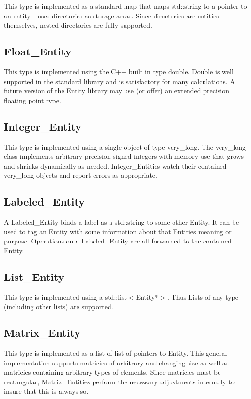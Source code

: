 \documentclass{report}
\begin{document}
This type is implemented as a standard map that maps std::string to a pointer to an entity.
\CLAC\ uses directories as storage areas. Since directories are entities themselves, nested
directories are fully supported.

\subsection{Float\_Entity}

This type is implemented using the C++ built in type double. Double is well supported in the
standard library and is satisfactory for many calculations. A future version of the Entity
library may use (or offer) an extended precision floating point type.

\subsection{Integer\_Entity}

This type is implemented using a single object of type very\_long. The very\_long class
implements arbitrary precision signed integers with memory use that grows and shrinks
dynamically as needed. Integer\_Entities watch their contained very\_long objects and report
errors as appropriate.

\subsection{Labeled\_Entity}

A Labeled\_Entity binds a label as a std::string to some other Entity. It can be used to tag an
Entity with some information about that Entities meaning or purpose. Operations on a
Labeled\_Entity are all forwarded to the contained Entity.

\subsection{List\_Entity}

This type is implemented using a std::list$<$Entity*$>$. Thus Lists of any type (including other
lists) are supported.

\subsection{Matrix\_Entity}

This type is implemented as a list of list of pointers to Entity. This general implementation
supports matricies of arbitrary and changing size as well as matricies containing arbitrary
types of elements. Since matricies must be rectangular, Matrix\_Entities perform the necessary
adjustments internally to insure that this is always so.
\end{document}
